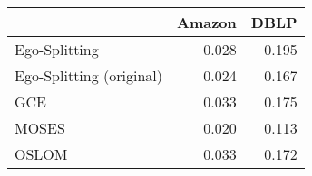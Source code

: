 \begin{tabular}{lrr}
\toprule
{} & Amazon &  DBLP \\
\midrule
Ego-Splitting            &  0.028 & 0.195 \\
Ego-Splitting (original) &  0.024 & 0.167 \\
GCE                      &  0.033 & 0.175 \\
MOSES                    &  0.020 & 0.113 \\
OSLOM                    &  0.033 & 0.172 \\
\bottomrule
\end{tabular}

